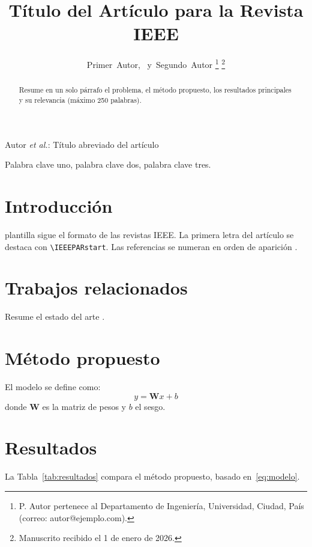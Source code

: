 \documentclass[journal]{IEEEtran}
\begin{document}
\title{Título del Artículo para la Revista IEEE}

\author{Primer~Autor,~
  y~Segundo~Autor%
  \thanks{P. Autor pertenece al Departamento de Ingeniería, Universidad, Ciudad, País
    (correo: autor@ejemplo.com).}%
  \thanks{Manuscrito recibido el 1 de enero de 2026.}}

%
{Autor \MakeLowercase{\textit{et al.}}: Título abreviado del artículo}

\maketitle

\begin{abstract}
Resume en un solo párrafo el problema, el método propuesto, los resultados principales
y su relevancia (máximo 250 palabras).
\end{abstract}

\begin{IEEEkeywords}
Palabra clave uno, palabra clave dos, palabra clave tres.
\end{IEEEkeywords}

\section{Introducción}
 plantilla sigue el formato de las revistas IEEE. La primera letra
del artículo se destaca con \texttt{\textbackslash IEEEPARstart}. Las referencias se
numeran en orden de aparición \cite{lamport1994}.

\section{Trabajos relacionados}
Resume el estado del arte \cite{knuth1984,goossens2004}.

\section{Método propuesto}
El modelo se define como:
\begin{equation}
  y = \mathbf{W}x + b
  \label{eq:modelo}
\end{equation}
donde $\mathbf{W}$ es la matriz de pesos y $b$ el sesgo.

\section{Resultados}
La Tabla~\ref{tab:resultados} compara el método propuesto, basado en~\eqref{eq:modelo}.
\end{document}
